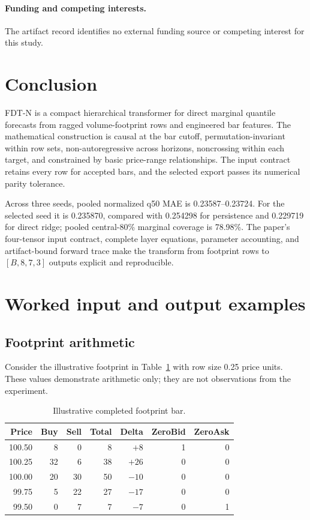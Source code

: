 \documentclass[10pt]{article}
\begin{document}
\paragraph{Funding and competing interests.}
The artifact record identifies no external funding source or competing interest for this study.

\section{Conclusion}

FDT-N is a compact hierarchical transformer for direct marginal quantile forecasts from ragged
volume-footprint rows and engineered bar features. The mathematical construction is causal at the
bar cutoff, permutation-invariant within row sets, non-autoregressive across horizons, noncrossing
within each target, and constrained by basic price-range relationships. The input contract retains
every row for accepted bars, and the selected export passes its numerical parity tolerance.

Across three seeds, pooled normalized q50 MAE is 0.23587--0.23724. For the selected seed it is
0.235870, compared with 0.254298 for persistence and 0.229719 for direct ridge; pooled central-80\%
marginal coverage is 78.98\%. The paper's four-tensor input contract, complete layer equations,
parameter accounting, and artifact-bound forward trace make the transform from footprint rows to
$[B,8,7,3]$ outputs explicit and reproducible.

\appendix

\section{Worked input and output examples}

\subsection{Footprint arithmetic}

Consider the illustrative footprint in Table~\ref{tab:worked-footprint} with row size 0.25 price
units. These values demonstrate arithmetic only; they are not observations from the experiment.

\begin{table}[H]
\centering
\small
\caption{Illustrative completed footprint bar.}
\label{tab:worked-footprint}
\begin{tabular}{@{}rrrrrrr@{}}
\toprule
Price & Buy & Sell & Total & Delta & ZeroBid & ZeroAsk \\
\midrule
100.50 & 8 & 0 & 8 & $+8$ & 1 & 0 \\
100.25 & 32 & 6 & 38 & $+26$ & 0 & 0 \\
100.00 & 20 & 30 & 50 & $-10$ & 0 & 0 \\
99.75 & 5 & 22 & 27 & $-17$ & 0 & 0 \\
99.50 & 0 & 7 & 7 & $-7$ & 0 & 1 \\
\bottomrule
\end{tabular}
\end{table}
\end{document}
